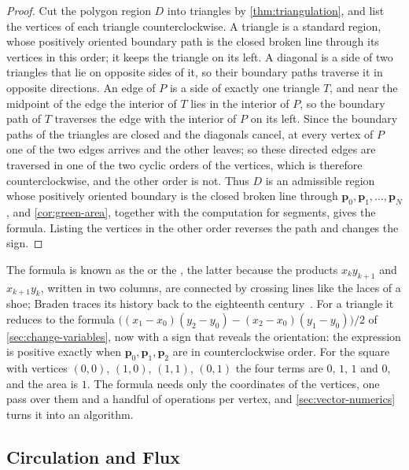 \begin{proof}
Cut the polygon region $D$ into triangles by \cref{thm:triangulation}, and list the vertices of each triangle counterclockwise. A triangle is a standard region, whose positively oriented boundary path is the closed broken line through its vertices in this order; it keeps the triangle on its left. A diagonal is a side of two triangles that lie on opposite sides of it, so their boundary paths traverse it in opposite directions. An edge of $P$ is a side of exactly one triangle $T$, and near the midpoint of the edge the interior of $T$ lies in the interior of $P$, so the boundary path of $T$ traverses the edge with the interior of $P$ on its left. Since the boundary paths of the triangles are closed and the diagonals cancel, at every vertex of $P$ one of the two edges arrives and the other leaves; so these directed edges are traversed in one of the two cyclic orders of the vertices, which is therefore counterclockwise, and the other order is not. Thus $D$ is an admissible region whose positively oriented boundary is the closed broken line through $\mathbf p_0,\mathbf p_1,\ldots,\mathbf p_N$, and \cref{cor:green-area}, together with the computation for segments, gives the formula. Listing the vertices in the other order reverses the path and changes the sign.
\end{proof}

The formula is known as the  or the , the latter because the products $x_ky_{k+1}$ and $x_{k+1}y_k$, written in two columns, are connected by crossing lines like the laces of a shoe; Braden traces its history back to the eighteenth century~\cite{braden1986}. For a triangle it reduces to the formula $\bigl((x_1-x_0)(y_2-y_0)-(x_2-x_0)(y_1-y_0)\bigr)/2$ of \cref{sec:change-variables}, now with a sign that reveals the orientation: the expression is positive exactly when $\mathbf p_0,\mathbf p_1,\mathbf p_2$ are in counterclockwise order. For the square with vertices $(0,0)$, $(1,0)$, $(1,1)$, $(0,1)$ the four terms are $0$, $1$, $1$ and $0$, and the area is $1$. The formula needs only the coordinates of the vertices, one pass over them and a handful of operations per vertex, and \cref{sec:vector-numerics} turns it into an algorithm.

\subsection{Circulation and Flux}

